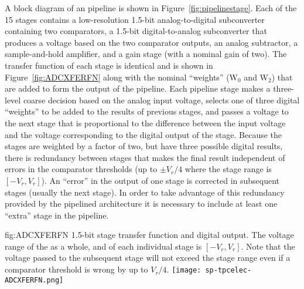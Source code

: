 A block diagram of an  pipeline is shown in
Figure~\ref{fig:pipelinestage}. Each of the \num{15} stages contains a low-resolution
\num{1.5}-bit analog-to-digital subconverter containing two comparators, a
\num{1.5}-bit digital-to-analog subconverter that produces a voltage based on
the two comparator outputs, an analog subtractor, a sample-and-hold amplifier,
and a gain stage (with a nominal gain of two). The transfer function of
each stage is identical and is shown in Figure~\ref{fig:ADCXFERFN} along with
the nominal ``weights'' (W$_0$ and W$_2$) that are added to form the output of the
pipeline. Each pipeline stage makes a three-level coarse decision based on the
analog input voltage, selects one of three digital ``weights'' to be added to the
results of previous stages, and passes a voltage to the next stage that is
proportional to the difference between the input voltage and the voltage
corresponding to the digital output of the stage.  Because the stages are
weighted by a factor of two, but have three possible digital results, there is
redundancy between stages that makes the final result independent of errors in
the comparator thresholds (up to $\pm V_r/4$ where the stage range is
$[-V_r,V_r]$).  An ``error'' in the output of one stage is corrected in subsequent
stages (usually the next stage).  In order to take advantage of this redundancy
provided by the pipelined architecture it is necessary to include at least one
``extra'' stage in the pipeline. 

\begin{dunefigure}
{fig:ADCXFERFN}
{\num{1.5}-bit stage transfer function and digital output. The voltage 
range of the  as a whole, and of each individual stage 
is $[-V_r,V_r]$.  Note that the voltage passed to the subsequent 
stage will not exceed the stage range even if a comparator threshold 
is wrong by up to $V_r/4$.}
\texttt{[image: sp-tpcelec-ADCXFERFN.png]}
\end{dunefigure}

